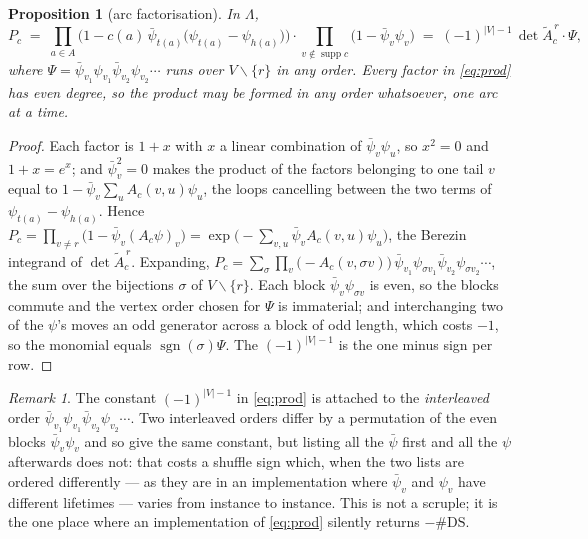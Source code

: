 \documentclass[11pt]{article}
\theoremstyle{plain}
\newtheorem{proposition}[theorem]{Proposition}
\theoremstyle{definition}
\theoremstyle{remark}
\newtheorem{remark}[theorem]{Remark}
\newcommand{\supp}{\operatorname{supp}}
\newcommand{\DS}{\mathrm{DS}}
\newcommand{\bpsi}{\bar\psi}
\begin{document}
\begin{proposition}[arc factorisation]\label{prop:arc}
In $\Lambda$,
\begin{equation}\label{eq:prod}
P_c \;=\;
\prod_{a\in A}\Big(1-c(a)\,\bpsi_{t(a)}\big(\psi_{t(a)}-\psi_{h(a)}\big)\Big)
\cdot\!\!\prod_{v\notin\supp c}\!\!\big(1-\bpsi_v\psi_v\big)
\;=\;(-1)^{|V|-1}\,\det \widetilde A_c^{\,r}\cdot\Psi ,
\end{equation}
where $\Psi=\bpsi_{v_1}\psi_{v_1}\bpsi_{v_2}\psi_{v_2}\cdots$ runs over
$V\smallsetminus\{r\}$ in any order. Every factor in \eqref{eq:prod} has even degree, so the
product may be formed in any order whatsoever, one arc at a time.
\end{proposition}

\begin{proof}
Each factor is $1+x$ with $x$ a linear combination of $\bpsi_v\psi_u$, so $x^2=0$ and
$1+x=e^{x}$; and $\bpsi_v^2=0$ makes the product of the factors belonging to one tail $v$ equal
to $1-\bpsi_v\sum_u A_c(v,u)\psi_u$, the loops cancelling between the two terms of
$\psi_{t(a)}-\psi_{h(a)}$. Hence
$P_c=\prod_{v\ne r}\big(1-\bpsi_v(A_c\psi)_v\big)=\exp\big(-\sum_{v,u}\bpsi_vA_c(v,u)\psi_u\big)$,
the Berezin integrand of $\det\widetilde A^{\,r}_c$. Expanding,
$P_c=\sum_\sigma\prod_{v}\big(-A_c(v,\sigma v)\big)\,
\bpsi_{v_1}\psi_{\sigma v_1}\bpsi_{v_2}\psi_{\sigma v_2}\cdots$,
the sum over the bijections $\sigma$ of $V\smallsetminus\{r\}$. Each block $\bpsi_v\psi_{\sigma v}$
is even, so the blocks commute and the vertex order chosen for $\Psi$ is immaterial; and
interchanging two of the $\psi$'s moves an odd generator across a block of odd length, which
costs $-1$, so the monomial equals $\operatorname{sgn}(\sigma)\Psi$. The $(-1)^{|V|-1}$ is the
one minus sign per row.
\end{proof}

\begin{remark}\label{rem:interleave}
The constant $(-1)^{|V|-1}$ in \eqref{eq:prod} is attached to the \emph{interleaved} order
$\bpsi_{v_1}\psi_{v_1}\bpsi_{v_2}\psi_{v_2}\cdots$. Two interleaved orders differ by a
permutation of the even blocks $\bpsi_v\psi_v$ and so give the same constant, but listing all
the $\bpsi$ first and all the $\psi$ afterwards does not: that costs a shuffle sign which, when
the two lists are ordered differently --- as they are in an implementation where $\bpsi_v$ and
$\psi_v$ have different lifetimes --- varies from instance to instance. This is not a
scruple; it is the one place where an implementation of \eqref{eq:prod} silently returns
$-\#\DS$.
\end{remark}
\end{document}
